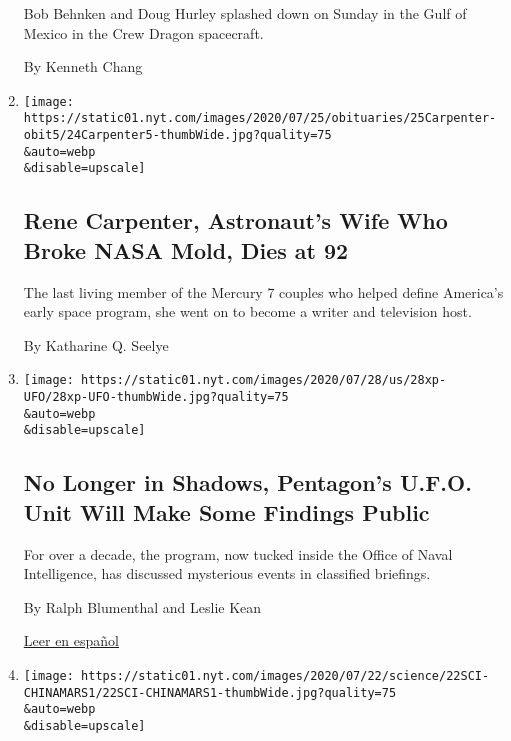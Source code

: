 \begin{enumerate}
  Bob Behnken and Doug Hurley splashed down on Sunday in the Gulf of
  Mexico in the Crew Dragon spacecraft.

  By Kenneth Chang
\item
  \href{/2020/07/24/us/rene-carpenter-dead.html}{}

  \texttt{[image: https://static01.nyt.com/images/2020/07/25/obituaries/25Carpenter-obit5/24Carpenter5-thumbWide.jpg?quality=75\\\&auto=webp\\\&disable=upscale]}

  \hypertarget{rene-carpenter-astronauts-wife-who-broke-nasa-mold-dies-at-92}{%
  \subsection{Rene Carpenter, Astronaut's Wife Who Broke NASA Mold, Dies
  at
  92}\label{rene-carpenter-astronauts-wife-who-broke-nasa-mold-dies-at-92}}

  The last living member of the Mercury 7 couples who helped define
  America's early space program, she went on to become a writer and
  television host.

  By Katharine Q. Seelye
\item
  \href{/2020/07/23/us/politics/pentagon-ufo-harry-reid-navy.html}{}

  \texttt{[image: https://static01.nyt.com/images/2020/07/28/us/28xp-UFO/28xp-UFO-thumbWide.jpg?quality=75\\\&auto=webp\\\&disable=upscale]}

  \hypertarget{no-longer-in-shadows-pentagons-ufo-unit-will-make-some-findings-public}{%
  \subsection{No Longer in Shadows, Pentagon's U.F.O. Unit Will Make
  Some Findings
  Public}\label{no-longer-in-shadows-pentagons-ufo-unit-will-make-some-findings-public}}

  For over a decade, the program, now tucked inside the Office of Naval
  Intelligence, has discussed mysterious events in classified briefings.

  By Ralph Blumenthal and Leslie Kean

  \href{https://www.nytimes.com/es/2020/07/24/espanol/ovnis-pentagono.html}{Leer
  en español}
\item
  \href{/2020/07/22/science/china-mars-mission.html}{}

  \texttt{[image: https://static01.nyt.com/images/2020/07/22/science/22SCI-CHINAMARS1/22SCI-CHINAMARS1-thumbWide.jpg?quality=75\\\&auto=webp\\\&disable=upscale]}


\end{enumerate}

